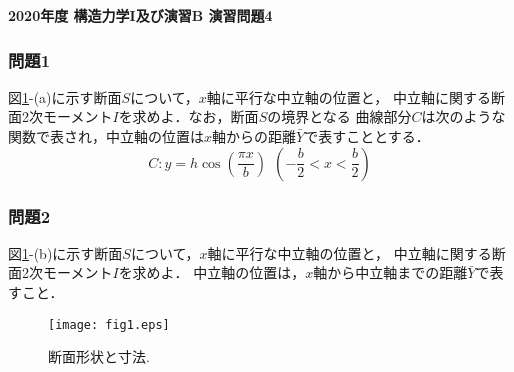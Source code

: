 \documentclass[10pt,a4j]{jarticle}
\newlength{\minitwocolumn}
\begin{document}
\newcommand{\fat}[1]{\mbox{\boldmath $#1$}}
\newcommand{\D}{\partial}
\newcommand{\w}{\omega}
\newcommand{\ga}{\alpha}
\newcommand{\gb}{\beta}
\newcommand{\gx}{\xi}
\newcommand{\gz}{\zeta}
\newcommand{\vhat}[1]{\hat{\fat{#1}}}
\newcommand{\spc}{\vspace{0.7\baselineskip}}
\newcommand{\halfspc}{\vspace{0.3\baselineskip}}

\pagestyle{empty}
\newcommand{\twofig}[2]
 {
   \begin{figure}[h]
     \begin{minipage}[t]{\minitwocolumn}
         \begin{center}   #1
         \end{center}
     \end{minipage}
         \hspace{\columnsep}
     \begin{minipage}[t]{\minitwocolumn}
         \begin{center} #2
         \end{center}
     \end{minipage}
   \end{figure}
 }
\begin{center}
{\Large \bf 2020年度 構造力学I及び演習B 演習問題4} \\
\end{center}
\subsubsection*{問題1}
図\ref{fig:fig1}-(a)に示す断面$S$について，$x$軸に平行な中立軸の位置と，
中立軸に関する断面2次モーメント$I$を求めよ．なお，断面$S$の境界となる
曲線部分$C$は次のような関数で表され，中立軸の位置は$x$軸からの距離$\bar{Y}$で表すこととする．
\begin{equation}
	C: y=h \cos \left( \frac{\pi x}{b}\right) 
	\ \ \left(-\frac{b}{2} < x < \frac{b}{2} \right)
\end{equation}
\subsubsection*{問題2}
図\ref{fig:fig1}-(b)に示す断面$S$について，$x$軸に平行な中立軸の位置と，
中立軸に関する断面2次モーメント$I$を求めよ．
中立軸の位置は，$x$軸から中立軸までの距離$\bar{Y}$で表すこと．

\vspace{15mm}
\begin{figure}[h]
	\begin{center}
	\texttt{[image: fig1.eps]} 
	\end{center}
	\caption{断面形状と寸法.} 
	\label{fig:fig1}
\end{figure}
\end{document}
